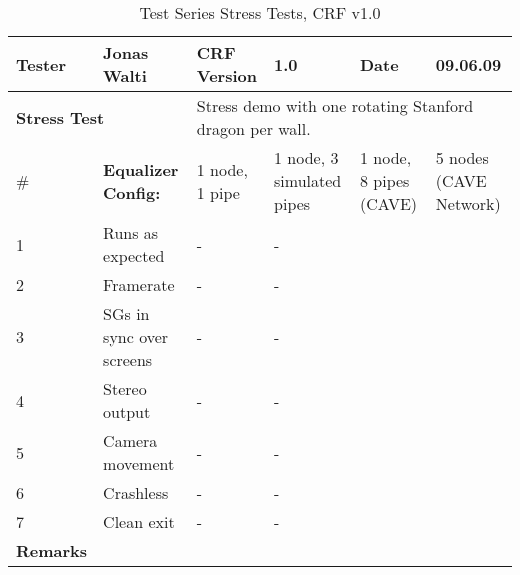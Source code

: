 \begin{table}[H]
	\centering
	\begin{tabular}{|b{}|b{}|m{}|m{}|m{}|m{}|}
		\hline
		\bfseries Tester & Jonas Walti & \bfseries CRF Version & 1.0 & \bfseries Date & 09.06.09 \\
		\hline
		\hline
		\multicolumn{2}{|l|}{\large{\bfseries Stress Test}} & \multicolumn{4}{p{0.6\textwidth}|}{Stress demo with one rotating Stanford dragon per wall.} \\
		\hline
		\hline
		\# & \bfseries Equalizer Config: & 1 node, 1 pipe & 1 node, 3 simulated pipes &  1 node, 8 pipes (CAVE) &  5 nodes (CAVE Network) \\
		\hline 1 & Runs as expected & \quad\quad- & \quad\quad- & \tick & \tick \\
		\hline 2 & Framerate & \quad\quad- & \quad\quad- & \quad\quad23 & \quad\quad108 \\
		\hline 3 & SGs in sync over screens & \quad\quad- & \quad\quad- & \tick & \tick \\
		\hline 4 & Stereo output & \quad\quad- & \quad\quad- & \tick & \tick \\
		\hline 5 & Camera movement & \quad\quad- & \quad\quad- & \tick & \tick \\
		\hline 6 & Crashless & \quad\quad- & \quad\quad- & \tick & \tick \\
		\hline 7 & Clean exit & \quad\quad- & \quad\quad- & \tick & \tick \\
		\hline
		\hline \bfseries Remarks & \multicolumn{5}{p{0.85\textwidth}|}{}\\
		\hline
	\end{tabular}
	\caption{Test Series Stress Tests, CRF v1.0}
\end{table}

